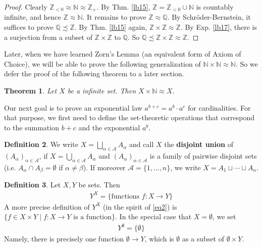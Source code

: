 \documentclass[12pt,b5paper,notitlepage]{article}
\theoremstyle{definition}
\newtheorem{df}{Definition}[section]
\theoremstyle{plain}
\newtheorem{thm}[df]{Theorem}
\newcommand{\scr}{\mathscr}
\newcommand{\Nbb}{\mathbb N}
\newcommand{\Zbb}{\mathbb Z}
\newcommand{\Qbb}{\mathbb Q}
\numberwithin{equation}{section}
\begin{document}
\begin{proof}
Clearly $\Zbb_{<0}\approx\Nbb\approx \Zbb_+$. By Thm. \ref{lb15}, $\Zbb=\Zbb_{<0}\cup\Nbb$ is countably infinite, and hence $\Zbb\approx\Nbb$. It remains to prove $\Zbb\approx\Qbb$. By Schr\"oder-Bernstein, it suffices to prove $\Qbb\precsim\Zbb$.  By Thm. \ref{lb15} again, $\Zbb\times\Zbb\approx\Zbb$. By Exp. \ref{lb17}, there is a surjection from a subset of $\Zbb\times\Zbb$ to $\Qbb$. So $\Qbb\precsim\Zbb\times\Zbb\approx\Zbb$.
\end{proof}



Later, when we have learned Zorn's Lemma (an equivalent form of Axiom of Choice), we will be able to prove the following generalization of $\Nbb\times\Nbb\approx\Nbb$. So we defer the proof of the following theorem to a later section.

\begin{thm}\label{lb16}
Let $X$ be a infinite set. Then $X\times\Nbb\approx X$.
\end{thm}





Our next goal is to prove an exponential law $a^{b+c}=a^b\cdot a^c$ for cardinalities. For that purpose, we first need to define the set-theoretic operations that correspond to the summation $b+c$ and the exponential $a^b$.


\begin{df}
We write $X=\bigsqcup_{\alpha\in\scr A}A_\alpha$ \index{A@$\bigsqcup_{\alpha\in\scr A}A_\alpha$, the disjoint union} and call $X$ the \textbf{disjoint union}  of $(A_\alpha)_{\alpha\in\scr A}$,  if $X=\bigcup_{\alpha\in\scr A}A_\alpha$ and $(A_\alpha)_{\alpha\in\scr A}$ is a family of pairwise disjoint sets (i.e. $A_\alpha\cap A_\beta=\emptyset$ if $\alpha\neq\beta$). If moreover $\scr A=\{1,\dots,n\}$, we write $X=A_1\sqcup\cdots\sqcup A_n$.
\end{df}

\begin{df}
Let $X,Y$ be sets. Then 
\begin{align}
Y^X=\{\text{functions }f:X\rightarrow Y\}
\end{align}
A more precise definition of $Y^X$ (in the spirit of \eqref{eq2}) is $\{f\in X\times Y \mid f:X\rightarrow Y\text{ is a function}\}$. In the special case that $X=\emptyset$, we set
\begin{align}
Y^\emptyset=\{\emptyset\}  \label{eq10}
\end{align}
Namely, there is precisely one function $\emptyset\rightarrow Y$, which is $\emptyset$  as a subset of $\emptyset\times Y$.
\end{df}
\end{document}
